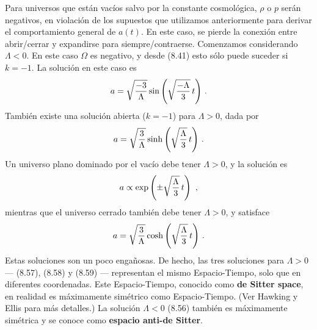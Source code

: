 \documentclass[11pt,b5paper,openany,twoside]{book}
\begin{document}
Para universos que están vacíos salvo por la constante cosmológica, $\rho$ o $p$ serán negativos, en violación de los supuestos que utilizamos anteriormente para derivar el comportamiento general de $a(t)$.
En este caso, se pierde la conexión entre abrir/cerrar y expandirse para siempre/contraerse.
Comenzamos considerando $\Lambda<0$.
En este caso $\Omega$ es negativo, y desde (8.41) esto sólo puede suceder si $k=-1$.
La solución en este caso es
\begin{equation}
a = \sqrt{{-3}\over\Lambda}\sin\left(\sqrt{{-\Lambda}\over 3} \, t
\right)\,.\label{8.56}
\end{equation}
También existe una solución abierta ($k=-1$) para $\Lambda>0$, dada por
\begin{equation}
a = \sqrt{{3}\over\Lambda}\sinh\left(\sqrt{{\Lambda}\over 3} \, t
\right)\,.\label{8.57}
\end{equation}
Un universo plano dominado por el vacío debe tener $\Lambda>0$, y la solución es
\begin{equation}
a\propto \exp\left(\pm\sqrt{{\Lambda}\over 3} \, t
\right)\ ,\label{8.58}
\end{equation}
mientras que el universo cerrado también debe tener $\Lambda>0$, y satisface
\begin{equation}
a= \sqrt{{3}\over\Lambda}\cosh\left(\sqrt{{\Lambda}\over 3} \, t
\right)\,.\label{8.59}
\end{equation}
Estas soluciones son un poco engañosas.
De hecho, las tres soluciones para $\Lambda>0$ --- (8.57), (8.58) y (8.59) --- representan el mismo Espacio-Tiempo, solo que en diferentes coordenadas.
Este Espacio-Tiempo, conocido como {\bf de Sitter space}, en realidad es máximamente simétrico como Espacio-Tiempo.
(Ver Hawking y Ellis para más detalles.)
La solución $\Lambda<0$ (8.56) también es máximamente simétrica y se conoce como {\bf espacio anti-de Sitter}.
\end{document}

